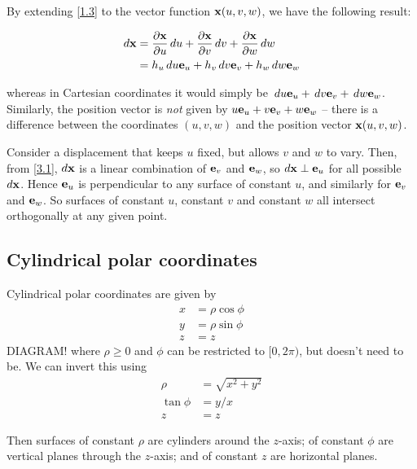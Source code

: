 \documentclass{../template/note}
\begin{document}
    By extending \cref{1.3} to the vector function \(\V x(u, v, w)\), we have the following result:
    \begin{proposition}
        \label{3.1}\begin{align*}
            d\V x &= \pd{\V x}{u} \D u + \pd{\V x}{v} \D v + \pd{\V x}{w} \D w \\
            &= h_u \D u \V e_u + h_v \D v \V e_v + h_w \D w \V e_w
        \end{align*}
    \end{proposition}
    whereas in Cartesian coordinates it would simply be \(\D u \V e_u + \D v \V e_v + \D w \V e_w\). Similarly, the position vector is \emph{not} given by \(u \V e_u + v \V e_v + w \V e_w\) -- there is a difference between the coordinates \((u, v, w)\) and the position vector \(\V x(u, v, w)\).

    Consider a displacement that keeps \(u\) fixed, but allows \(v\) and \(w\) to vary. Then, from \cref{3.1}, \(d\V x\) is a linear combination of \(\V e_v\) and \(\V e_w\), so \(d\V x \perp \V e_u\) for all possible \(d\V x\). Hence \(\V e_u\) is perpendicular to any surface of constant \(u\), and similarly for \(\V e_v\) and \(\V e_w\). So surfaces of constant \(u\), constant \(v\) and constant \(w\) all intersect orthogonally at any given point.

    \subsection{Cylindrical polar coordinates}

    \begin{definition*}
        Cylindrical polar coordinates are given by
        \begin{align*}
            x &= \rho \cos \phi \\
            y &= \rho \sin \phi \\
            z &= z
        \end{align*}
        DIAGRAM!
        where \(\rho \geq 0\) and \(\phi\) can be restricted to \([0, 2\pi)\), but doesn't need to be. We can invert this using
        \begin{align*}
            \rho &= \sqrt{x^2+y^2} \\
            \tan \phi &= y/x \\
            z &= z
        \end{align*} 
    \end{definition*}
    
    Then surfaces of constant \(\rho\) are cylinders around the \(z\)-axis; of constant \(\phi\) are vertical planes through the \(z\)-axis; and of constant \(z\) are horizontal planes. 
    
\end{document}
